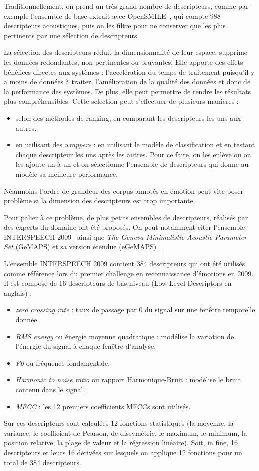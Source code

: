 Traditionnellement, on prend un très grand nombre de descripteurs, comme par exemple l'ensemble de base extrait avec OpenSMILE~\cite{OPENSMILE}, qui compte 988 descripteurs acoustiques, puis on les filtre pour ne conserver que les plus pertinents par une sélection de descripteurs.

La sélection des descripteurs réduit la dimensionnalité de leur espace, supprime les données redondantes, non pertinentes ou bruyantes. Elle apporte des effets bénéfices directes aux systèmes : l'accélération du temps de traitement puisqu'il y a moins de données à traiter, l'amélioration de la qualité des données et donc de la performance des systèmes. De plus, elle peut permettre de rendre les résultats plus compréhensibles.
Cette sélection peut s'effectuer de plusieurs manières :
\begin{itemize}
    \item selon des méthodes de ranking, en comparant les descripteurs les uns aux autres.
    \item en utilisant des \textit{wrappers} : en utilisant le modèle de classification et en testant chaque descripteur les uns après les autres. Pour ce faire, on les enlève ou on les ajoute un à un et on sélectionne l'ensemble de descripteurs qui donne au modèle sa meilleure performance.
\end{itemize}
Néanmoins l'ordre de grandeur des corpus annotés en émotion peut vite poser problème si la dimension des descripteurs est trop importante.

Pour palier à ce problème, de plus petits ensembles de descripteurs, réalisés par des experts du domaine ont été proposés. On peut notamment citer l'ensemble INTERSPEECH 2009~\cite{Schuller2009} ainsi que \textit{The Geneva Minimalistic Acoustic Parameter Set} (GeMAPS) et sa version étendue (eGeMAPS)~\cite{Eyben2016}.

L'ensemble INTERSPEECH 2009 contient 384 descripteurs qui ont été utilisés comme référence lors du premier challenge en reconnaissance d'émotions en 2009. Il est composé de 16 descripteurs de bas niveau (Low Level Descriptors en anglais) :
\begin{itemize}
  \item \textit{zero crossing rate} : taux de passage par 0 du signal sur une fenêtre temporelle donnée.
  \item \textit{RMS energy} ou énergie moyenne quadratique : modélise la variation de l’énergie du signal à chaque fenêtre d'analyse.
  \item \textit{F0} ou fréquence fondamentale.
  \item \textit{Harmonic to noise ratio} ou rapport Harmonique-Bruit : modélise le bruit contenu dans le signal.
  \item \textit{MFCC} : les 12 premiers coefficients MFCCs sont utilisés.
\end{itemize}
Sur ces descripteurs sont calculées 12 fonctions statistiques (la moyenne, la variance, le coefficient de Pearson, de dissymétrie, le maximum, le minimum, la position relative, la plage de valeur et la régression linéaire). Soit, in fine, 16 descripteurs et leurs 16 dérivées sur lesquels on applique 12 fonctions pour un total de 384 descripteurs.

